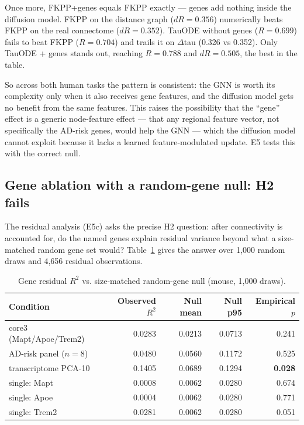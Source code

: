 \documentclass{article}
\begin{document}
Once more, FKPP+genes equals FKPP exactly --- genes add nothing inside the diffusion model. FKPP on the distance graph ($dR = 0.356$) numerically beats FKPP on the real connectome ($dR = 0.352$). TauODE without genes ($R = 0.699$) fails to beat FKPP ($R = 0.704$) and trails it on $\Delta$tau (0.326 vs 0.352). Only TauODE + genes stands out, reaching $R = 0.788$ and $dR = 0.505$, the best in the table.

So across both human tasks the pattern is consistent: the GNN is worth its complexity only when it also receives gene features, and the diffusion model gets no benefit from the same features. This raises the possibility that the ``gene'' effect is a generic node-feature effect --- that any regional feature vector, not specifically the AD-risk genes, would help the GNN --- which the diffusion model cannot exploit because it lacks a learned feature-modulated update. E5 tests this with the correct null.

\subsection{Gene ablation with a random-gene null: H2 fails}
\label{sec:e5}

The residual analysis (E5c) asks the precise H2 question: after connectivity is accounted for, do the named genes explain residual variance beyond what a size-matched random gene set would? Table~\ref{tab:genes} gives the answer over 1{,}000 random draws and 4{,}656 residual observations.

\begin{table}[t]
  \caption{Gene residual $R^2$ vs. size-matched random-gene null (mouse, 1{,}000 draws).}
  \label{tab:genes}
  \centering
  \begin{tabular}{lrrrr}
    \toprule
    Condition & Observed $R^2$ & Null mean & Null p95 & Empirical $p$ \\
    \midrule
    core3 (Mapt/Apoe/Trem2)  & 0.0283 & 0.0213 & 0.0713 & 0.241 \\
    AD-risk panel ($n=8$)    & 0.0480 & 0.0560 & 0.1172 & 0.525 \\
    transcriptome PCA-10     & 0.1405 & 0.0689 & 0.1294 & \textbf{0.028} \\
    single: Mapt             & 0.0008 & 0.0062 & 0.0280 & 0.674 \\
    single: Apoe             & 0.0004 & 0.0062 & 0.0280 & 0.771 \\
    single: Trem2            & 0.0281 & 0.0062 & 0.0280 & 0.051 \\
    \bottomrule
  \end{tabular}
\end{table}
\end{document}
